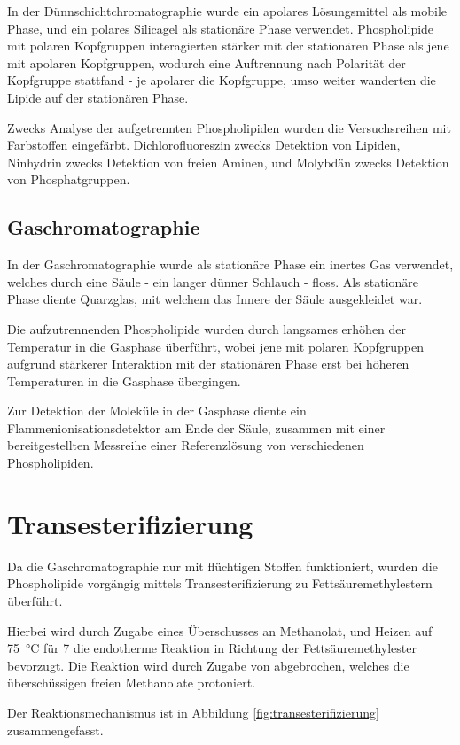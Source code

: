 \documentclass[a4paper,english]{scrreprt}
\begin{document}
In der Dünnschichtchromatographie wurde ein apolares Lösungsmittel als mobile
Phase, und ein polares Silicagel als stationäre Phase verwendet. Phospholipide
mit polaren Kopfgruppen interagierten stärker mit der stationären Phase als
jene mit apolaren Kopfgruppen, wodurch eine Auftrennung nach Polarität der
Kopfgruppe stattfand - je apolarer die Kopfgruppe, umso weiter wanderten die
Lipide auf der stationären Phase.

Zwecks Analyse der aufgetrennten Phospholipiden wurden die Versuchsreihen mit
Farbstoffen eingefärbt. Dichlorofluoreszin zwecks Detektion von Lipiden,
Ninhydrin zwecks Detektion von freien Aminen, und Molybdän zwecks Detektion
von Phosphatgruppen.

\subsection{Gaschromatographie}

In der Gaschromatographie wurde als stationäre Phase ein inertes Gas verwendet,
welches durch eine Säule - ein langer dünner Schlauch - floss. Als stationäre
Phase diente Quarzglas, mit welchem das Innere der Säule ausgekleidet war.

Die aufzutrennenden Phospholipide wurden durch langsames erhöhen der Temperatur
in die Gasphase überführt, wobei jene mit polaren Kopfgruppen aufgrund stärkerer
Interaktion mit der stationären Phase erst bei höheren Temperaturen in die
Gasphase übergingen.

Zur Detektion der Moleküle in der Gasphase diente ein
Flammenionisationsdetektor am Ende der Säule, zusammen mit einer
bereitgestellten Messreihe einer Referenzlösung von verschiedenen
Phospholipiden.

\section{Transesterifizierung}

Da die Gaschromatographie nur mit flüchtigen Stoffen funktioniert, wurden die
Phospholipide vorgängig mittels Transesterifizierung zu Fettsäuremethylestern
überführt. \cite{handoutv11}

Hierbei wird durch Zugabe eines Überschusses an Methanolat, und Heizen auf
\SI{75}{\celsius} für \SI{7}{\min} die endotherme Reaktion in Richtung der
Fettsäuremethylester bevorzugt. Die Reaktion wird durch Zugabe von 
abgebrochen, welches die überschüssigen freien Methanolate protoniert.

Der Reaktionsmechanismus ist in Abbildung \ref{fig:transesterifizierung}
zusammengefasst.
\end{document}
